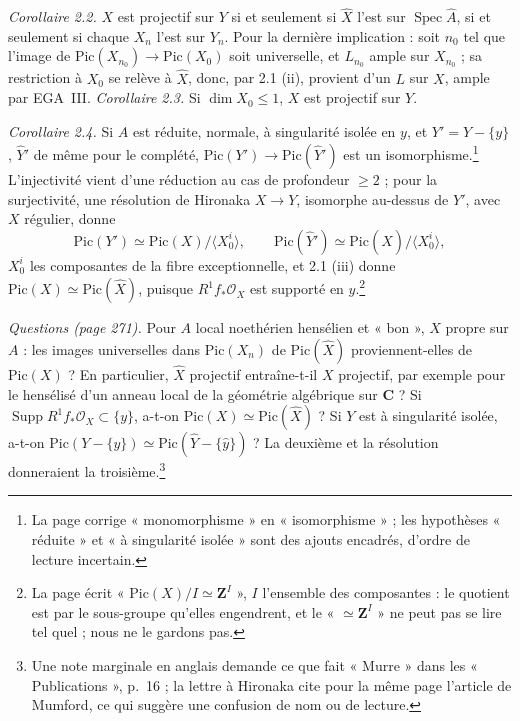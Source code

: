 \documentclass[11pt,a4paper]{article}
\begin{document}
\emph{Corollaire 2.2.} $X$ est projectif sur $Y$ si et seulement si $\hat{X}$
l'est sur $\operatorname{Spec}\hat{A}$, si et seulement si chaque $X_n$ l'est
sur $Y_n$. Pour la dernière implication : soit $n_0$ tel que l'image de
$\mathrm{Pic}(X_{n_0}) \to \mathrm{Pic}(X_0)$ soit universelle, et $L_{n_0}$
ample sur $X_{n_0}$ ; sa restriction à $X_0$ se relève à $\hat{X}$, donc, par
2.1 (ii), provient d'un $L$ sur $X$, ample par EGA~III. \emph{Corollaire 2.3.}
Si $\dim X_0 \leq 1$, $X$ est projectif sur $Y$.

\emph{Corollaire 2.4.} Si $A$ est réduite, normale, à singularité isolée en
$y$, et $Y' = Y - \{y\}$, $\hat{Y}'$ de même pour le complété,
$\mathrm{Pic}(Y') \to \mathrm{Pic}(\hat{Y}')$ est un
isomorphisme.\footnote{La page corrige « monomorphisme » en
« isomorphisme » ; les hypothèses « réduite » et « à singularité isolée » sont
des ajouts encadrés, d'ordre de lecture incertain.} L'injectivité vient d'une
réduction au cas de profondeur $\geq 2$ ; pour la surjectivité, une résolution
de Hironaka $X \to Y$, isomorphe au-dessus de $Y'$, avec $X$ régulier, donne
\[
\mathrm{Pic}(Y') \simeq \mathrm{Pic}(X)/\langle X_0^i \rangle, \qquad
\mathrm{Pic}(\hat{Y}') \simeq \mathrm{Pic}(\hat{X})/\langle X_0^i \rangle ,
\]
$X_0^i$ les composantes de la fibre exceptionnelle, et 2.1 (iii) donne
$\mathrm{Pic}(X) \simeq \mathrm{Pic}(\hat{X})$, puisque $R^1 f_*\mathcal{O}_X$
est supporté en $y$.\footnote{La page écrit « $\mathrm{Pic}(X)/I \simeq \mathbf{Z}^I$ »,
$I$ l'ensemble des composantes : le quotient est par le sous-groupe qu'elles
engendrent, et le « $\simeq \mathbf{Z}^I$ » ne peut pas se lire tel quel ; nous
ne le gardons pas.}

\emph{Questions (page 271).} Pour $A$ local noethérien hensélien et « bon »,
$X$ propre sur $A$ : les images universelles dans $\mathrm{Pic}(X_n)$ de
$\mathrm{Pic}(\hat{X})$ proviennent-elles de $\mathrm{Pic}(X)$ ? En particulier,
$\hat{X}$ projectif entraîne-t-il $X$ projectif, par exemple pour le hensélisé
d'un anneau local de la géométrie algébrique sur $\mathbf{C}$ ? Si
$\operatorname{Supp} R^1 f_*\mathcal{O}_X \subset \{y\}$, a-t-on
$\mathrm{Pic}(X) \simeq \mathrm{Pic}(\hat{X})$ ? Si $Y$ est à singularité isolée,
a-t-on $\mathrm{Pic}(Y - \{y\}) \simeq \mathrm{Pic}(\hat{Y} - \{\hat{y}\})$ ? La
deuxième et la résolution donneraient la troisième.\footnote{Une note marginale
en anglais demande ce que fait « Murre » dans les « Publications », p.~16 ; la
lettre à Hironaka cite pour la même page l'article de Mumford, ce qui suggère
une confusion de nom ou de lecture.}
\end{document}
